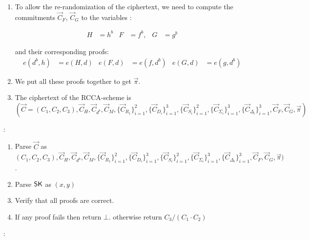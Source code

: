 \begin{description}
\begin{enumerate}
  \item To allow the re-randomization of the ciphertext, we need to compute the commitments $\vec{C}_F$, $\vec{C}_G$ to the variables :

    \begin{align*}
    H &= h^b & F &= f^b, & G&=g^b
    \end{align*}

    and their corresponding proofs:
    \begin{align}
      e(\boxed{d^b}, h) &= e(\boxed{H},d) & e(\boxed{F},d) &= e(f,\boxed{d^b}) & e(\boxed{G}, d) &= e(g, \boxed{d^b})\tag{13, 14, 15}
    \end{align}

    
  \item We put all these proofs together to get $\vec{\pi}$.
  \item The ciphertext of the RCCA-scheme is
    $$(\vec{C} = (C_1, C_2, C_3), \vec{C}_{H}, \vec{C}_{d^b}, \vec{C}_{M}, \{\vec{C}_{R_1}\}_{i= 1}^2, \{\vec{C}_{D_i}\}_{i = 1}^3, \{\vec{C}_{S_i}\}_{i = 1}^2, \{\vec{C}_{\Sigma_i}\}_{i = 1}^3,\{\vec{C}_{\Delta_i}\}_{i=1}^3, \vec{C}_F, \vec{C}_G, \vec{\pi})$$
    
  \end{enumerate}

\item[\boldmath{$RCCA1.\Dec(\PK,\SK, \vec{C})$}]:
  \begin{enumerate}
  \item Parse $\vec{C}$ as $(C_1, C_2, C_3), \vec{C}_{H}, \vec{C}_{d^b}, \vec{C}_{M}, \{\vec{C}_{R_1}\}_{i= 1}^2, \{\vec{C}_{D_i}\}_{i = 1}^3, \{\vec{C}_{S_i}\}_{i = 1}^2, \{\vec{C}_{\Sigma_i}\}_{i = 1}^3,\{\vec{C}_{\Delta_i}\}_{i=1}^3, \vec{C}_F, \vec{C}_G, \vec{\pi})$.
  \item Parse $\mathsf{SK}$ as $(x,y)$
  \item Verify that all proofs are correct.
  \item If any proof fails then return $\bot$. otherwise return $C_3/(C_1 \cdot C_2)$ 
  \end{enumerate}
  
\item[\boldmath{$RCCA1.\Rerand(\PK, C)$}]:
  

\end{description}


%
